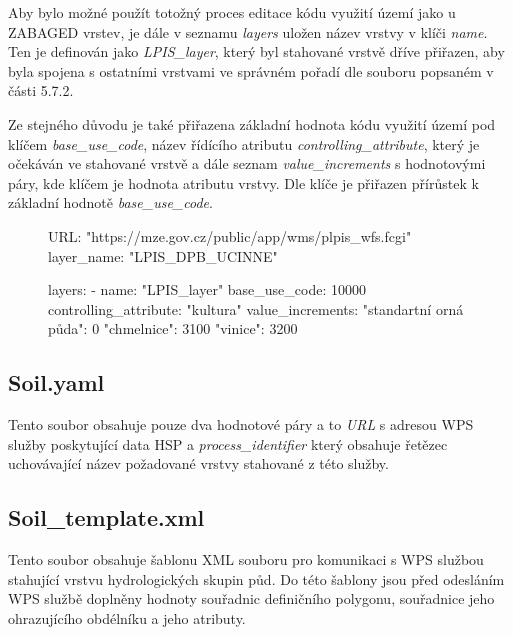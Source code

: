 \documentclass[a4paper,oneside,12pt]{book}
\begin{document}
\hspace{10mm} Aby bylo možné použít totožný proces editace kódu využití území jako u ZABAGED vrstev, je dále v seznamu \textit{layers} uložen název vrstvy v klíči \textit{name}. Ten je definován jako \textit{LPIS\_layer}, který byl stahované vrstvě dříve přiřazen, aby byla spojena s ostatními vrstvami ve správném pořadí dle souboru popsaném v části 5.7.2.

\hspace{10mm}Ze stejného důvodu je také přiřazena základní hodnota kódu využití území pod klíčem \textit{base\_use\_code}, název řídícího atributu \textit{controlling\_attribute}, který je očekáván ve stahované vrstvě a dále seznam \textit{value\_increments} s hodnotovými páry, kde klíčem je hodnota atributu vrstvy. Dle klíče je přiřazen přírůstek k základní hodnotě \textit{base\_use\_code}.

\begin{figure}[H]
\begin{pythoncode}[style=myyaml, caption={Ukázka LPIS.yaml},label={kod:LPIS.yaml}]
URL: "https://mze.gov.cz/public/app/wms/plpis_wfs.fcgi"
layer_name: "LPIS_DPB_UCINNE"

layers:
  - name: "LPIS_layer"
    base_use_code: 10000
    controlling_attribute: "kultura"
    value_increments:
      "standartní orná půda": 0
      "chmelnice": 3100
      "vinice": 3200
\end{pythoncode}
\end{figure}

\subsection{Soil.yaml} \label{Soil.yaml}
Tento soubor obsahuje pouze dva hodnotové páry a to \textit{URL} s adresou WPS služby poskytující data HSP a \textit{process\_identifier} který obsahuje řetězec uchovávající název požadované vrstvy stahované z této služby.


\subsection{Soil\_template.xml} \label{Soil_template.xml}
\hspace{10mm} Tento soubor obsahuje šablonu XML souboru pro komunikaci s WPS službou stahující vrstvu hydrologických skupin půd.
Do této šablony jsou před odesláním WPS službě doplněny hodnoty souřadnic definičního polygonu, souřadnice jeho ohrazujícího obdélníku a jeho atributy.
\end{document}
